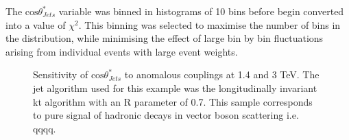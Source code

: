 The $\text{cos}\theta^{*}_{Jets}$ variable was binned in histograms of 10 bins before begin converted into a value of $\chi^{2}$.  This binning was selected to maximise the number of bins in the distribution, while minimising the effect of large bin by bin fluctuations arising from individual events with large event weights.

\begin{figure}
\caption[Sensitivity of $\text{cos}\theta^{8}_{Jets}$ to the anomalous gauge couplings $\alpha_{4}$ and $\alpha_{5}$ at 1.4 and 3 TeV.]{Sensitivity of $\text{cos}\theta^{*}_{Jets}$ to anomalous couplings at 1.4 and 3 TeV. The jet algorithm used for this example was the longitudinally invariant kt algorithm with an R parameter of 0.7. This sample corresponds to pure signal of hadronic decays in vector boson scattering i.e. \nu{\nu}qqqq.}
\label{fig:costhetastarjets}
\end{figure}

